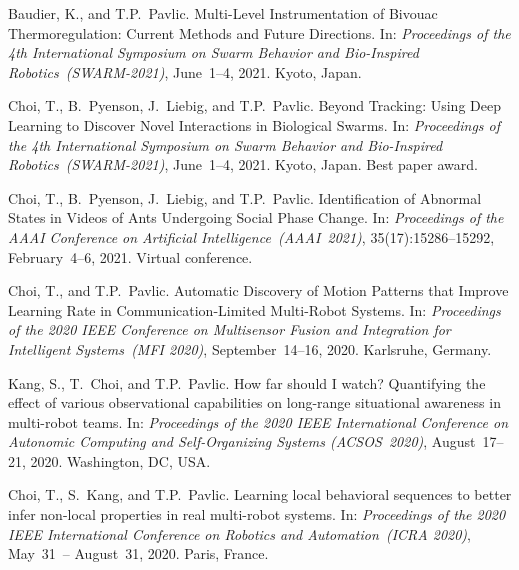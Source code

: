 \documentclass[10pt]{article}
\begin{document}
\begin{bibenum}
    \item Baudier, K., and T.P.~Pavlic.
        Multi-Level Instrumentation of Bivouac Thermoregulation: Current
        Methods and Future Directions.
        In: \emph{Proceedings of the 4th International Symposium on
            Swarm Behavior and Bio-Inspired Robotics~(SWARM-2021)},
            June~1--4, 2021. Kyoto, Japan.

    \item Choi, T., B.~Pyenson, J.~Liebig, and T.P.~Pavlic.
        Beyond Tracking: Using Deep Learning to Discover Novel
        Interactions in Biological Swarms.
        In: \emph{Proceedings of the 4th International Symposium on
            Swarm Behavior and Bio-Inspired Robotics~(SWARM-2021)},
            June~1--4, 2021. Kyoto, Japan. Best paper award.

    \item Choi, T., B.~Pyenson, J.~Liebig, and T.P.~Pavlic.
        Identification of Abnormal States in Videos of Ants Undergoing
        Social Phase Change.
        In: \emph{Proceedings of the AAAI Conference on Artificial
            Intelligence~(AAAI~2021)}, 35(17):15286--15292,
            February~4--6, 2021. Virtual conference.

    \item Choi, T., and T.P.~Pavlic.
        Automatic Discovery of Motion Patterns that Improve Learning
        Rate in Communication-Limited Multi-Robot Systems.
        In: \emph{Proceedings of the 2020 IEEE Conference on Multisensor
        Fusion and Integration for Intelligent Systems~(MFI 2020)},
        September~14--16, 2020. Karlsruhe, Germany.

    \item Kang, S., T.~Choi, and T.P.~Pavlic.
        How far should I watch? Quantifying the effect of various
        observational capabilities on long-range situational awareness
        in multi-robot teams.
        In: \emph{Proceedings of the 2020 IEEE International Conference
        on Autonomic Computing and Self-Organizing Systems
        (ACSOS~2020)}, August~17--21, 2020. Washington, DC, USA.

    \item Choi, T., S.~Kang, and T.P.~Pavlic.
        Learning local behavioral sequences to better infer non-local
        properties in real multi-robot systems.
        In: \emph{Proceedings of the 2020 IEEE International Conference
        on Robotics and Automation~(ICRA 2020)}, May~31~-- August~31,
        2020. Paris, France.


\end{bibenum}
\end{document}
